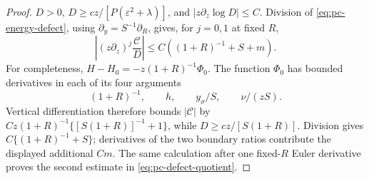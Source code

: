 \begin{proof}
$D>0$, $D\ge cz/[P(\varepsilon^2+\lambda)]$, and
$|z\partial_z\log D|\le C$. Division of
\eqref{eq:pc-energy-defect}, using $\partial_y=S^{-1}\partial_R$,
gives, for $j=0,1$ at fixed $R$,
\begin{equation}
\label{eq:pc-defect-quotient}
 \left|(z\partial_z)^j\frac{\mathcal C}{D}\right|
             \le C((1+R)^{-1}+S+m).
\end{equation}
For completeness, $H-H_0=-z(1+R)^{-1}\Phi_0$. The function $\Phi_0$
has bounded derivatives in each of its four arguments
\[
 (1+R)^{-1},\qquad h,\qquad y_\sigma/S,\qquad \nu/(zS).
\]
Vertical differentiation therefore bounds $|\mathcal C|$ by
$Cz(1+R)^{-1}\{[S(1+R)]^{-1}+1\}$, while
$D\ge cz/[S(1+R)]$.  Division gives
$C\{(1+R)^{-1}+S\}$; derivatives of the two boundary ratios contribute
the displayed additional $Cm$.  The same calculation after one fixed-$R$
Euler derivative proves the second estimate in
\eqref{eq:pc-defect-quotient}.


\end{proof}
